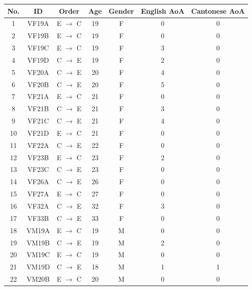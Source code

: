 \begin{table}[!htbp]
  \begin{center}
  \begin{tabular}{ccccccc}
  \toprule
  \textbf{No.} & \textbf{ID} & \textbf{Order} & \textbf{Age} & \textbf{Gender} & \textbf{English AoA} & \textbf{Cantonese AoA} \\
  \midrule
  1 & VF19A & E $\rightarrow$ C & 19  & F & 0   & 0 \\
  2 & VF19B & E $\rightarrow$ C & 19  & F & 0   & 0 \\
  3 & VF19C & E $\rightarrow$ C & 19  & F & 3   & 0 \\
  4 & VF19D & C $\rightarrow$ E & 19  & F & 2   & 0 \\
  5 & VF20A & C $\rightarrow$ E & 20  & F & 4   & 0 \\
  6 & VF20B & C $\rightarrow$ E & 20  & F & 5   & 0 \\
  7 & VF21A & E $\rightarrow$ C & 21  & F & 0   & 0 \\
  8 & VF21B & C $\rightarrow$ E & 21  & F & 3   & 0 \\
  9 & VF21C & C $\rightarrow$ E & 21  & F & 4   & 0 \\
  10  & VF21D & E $\rightarrow$ C & 21  & F & 0   & 0 \\
  11  & VF22A & C $\rightarrow$ E & 22  & F & 0   & 0 \\
  12  & VF23B & E $\rightarrow$ C & 23  & F & 2   & 0 \\
  13  & VF23C & C $\rightarrow$ E & 23  & F & 0   & 0 \\
  14  & VF26A & C $\rightarrow$ E & 26  & F & 0   & 0 \\
  15  & VF27A & E $\rightarrow$ C & 27  & F & 0   & 0 \\
  16  & VF32A & C $\rightarrow$ E & 32  & F & 3   & 0 \\
  17  & VF33B & C $\rightarrow$ E & 33  & F & 0   & 0 \\
  18  & VM19A & E $\rightarrow$ C & 19  & M & 0   & 0 \\
  19  & VM19B & C $\rightarrow$ E & 19  & M & 2   & 0 \\
  20  & VM19C & E $\rightarrow$ C & 19  & M & 0   & 0 \\
  21  & VM19D & C $\rightarrow$ E & 18  & M & 1   & 1 \\
  22  & VM20B & E $\rightarrow$ C & 20  & M & 0   & 0 \\

\end{tabular}
\end{center}
\end{table}
